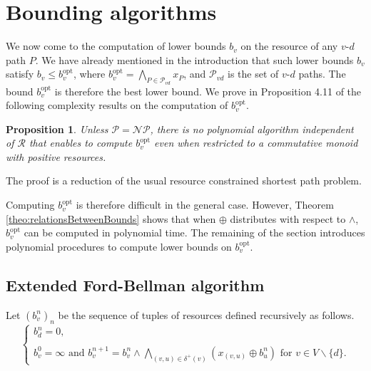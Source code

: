 \documentclass[11pt]{amsart}
\theoremstyle{plain}
\newtheorem{prop}[theo]{Proposition}
\theoremstyle{remark}
\newcommand{\rplus}{\oplus}
\newcommand{\rleq}{\leqslant}
\newcommand{\rset}{\mathcal{R}}
\newcommand{\re}{x}
\newcommand{\meet}{\wedge} \newcommand{\bigmeet}{\bigwedge}
\begin{document}
\section{Bounding algorithms} \label{sec:bounding_algorithms}

We now come to the computation of lower bounds $b_{v}$ on the resource of any $v$-$d$ path $P$. We have already mentioned in the introduction that such lower bounds $b_{v}$ satisfy $b_{v}\rleq b_{v}^{\mathrm{opt}}$, where $b_{v}^{\mathrm{opt}}= \bigmeet_{P \in \mathcal{P}_{vd}}\re_{P}$, and $\mathcal{P}_{vd}$ is the set of $v$-$d$ paths. The bound $b_{v}^{\mathrm{opt}}$ is therefore the best lower bound. We prove in Proposition 4.11 of \cite{parmentier2016thesis} the following complexity results on the computation of $b_{v}^{\mathrm{opt}}$.

\begin{prop}\label{prop:bvoptComplexity}
Unless $\mathcal{P} = \mathcal{NP}$, there is no polynomial algorithm independent of $\rset$ that enables to compute $b_{v}^{\mathrm{opt}}$ even when restricted to a commutative monoid with positive resources.
\end{prop}
The proof is a reduction of the usual resource constrained shortest path problem.

Computing $b_{v}^{\mathrm{opt}}$ is therefore difficult in the general case. However, Theorem \ref{theo:relationsBetweenBounds} shows that when $\rplus$ distributes with respect to $\meet$, $b_{v}^{\mathrm{opt}}$ can be computed in polynomial time. The remaining of the section introduces polynomial procedures to compute lower bounds on $b_{v}^{\mathrm{opt}}$. 

\subsection{Extended Ford-Bellman algorithm} \label{sub:extended_ford_bellman_algorithm}
Let $\left(b_{v}^{n}\right)_{n}$ be the sequence of tuples of resources defined recursively as follows. \begin{equation}\label{eq:zSequenceDefinition}
	\left\{\begin{array}{l}
	b_{d}^{n} = 0, \\
\\
	b_{v}^{0} = \infty \text{ and } b_{v}^{n+1} = \displaystyle b_{v}^{n} \meet \bigmeet_{(v,u)\in \delta^{+}(v)}(\re_{(v,u)} \rplus b_{u}^{n}) \text{ for } v\in V\backslash \{d\}.
	\end{array}
	\right.
\end{equation}
\end{document}

